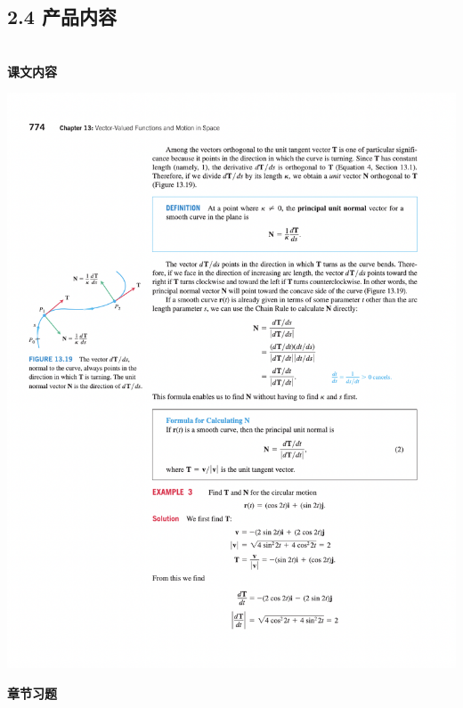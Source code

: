 \documentclass{report}
\begin{document}
\subsection*{2.4 产品内容}
~\\
\noindent\textbf{课文内容}
\begin{center}
    \includegraphics[width=\textwidth]{./content1.png}
\end{center}
\newpage
\noindent\textbf{章节习题}
\end{document}
